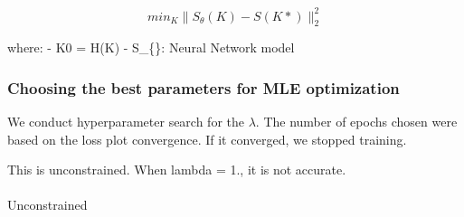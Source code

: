 \documentclass[
]{article}
\makeatletter
\let\oldparagraph\paragraph
\renewcommand{\paragraph}{
    \@ifstar
      \xxxParagraphStar
      \xxxParagraphNoStar
  }
\newcommand{\xxxParagraphStar}[1]{\oldparagraph*{#1}\mbox{}}
\newcommand{\xxxParagraphNoStar}[1]{\oldparagraph{#1}\mbox{}}
\makeatother
\begin{document}
\[ min_{K} \|S_{\theta}(K) - S(K*) \|^2_2 \]

where: - K0 = H(K) - S\_\{\theta\}: Neural Network model

\subsubsection{Choosing the best parameters for MLE
optimization}\label{choosing-the-best-parameters-for-mle-optimization}

We conduct hyperparameter search for the \(\lambda\). The number of
epochs chosen were based on the loss plot convergence. If it converged,
we stopped training.

This is unconstrained. When lambda = 1., it is not accurate.

\paragraph{Unconstrained}\label{unconstrained}
\end{document}
